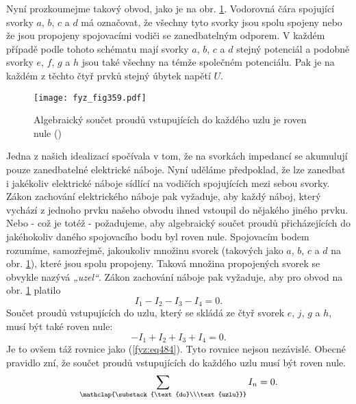   Nyní prozkoumejme takový obvod, jako je na obr. \ref{fyz:fig359}. Vodorovná čára spojující svorky 
  \(a\), \(b\), \(c\) a \(d\) má označovat, že všechny tyto svorky jsou spolu spojeny nebo že jsou 
  propojeny spojovacími vodiči se zanedbatelným odporem. V každém případě podle tohoto schématu 
  mají svorky \(a\), \(b\), \(c\) a \(d\) stejný potenciál a podobně svorky \(e\), \(f\), \(g\) a 
  \(h\) jsou také všechny na témže společném potenciálu. Pak je na každém z těchto čtyř prvků 
  stejný úbytek napětí \(U\).

  \begin{figure}[ht!] %
    \centering
    \texttt{[image: fyz\_fig359.pdf]}
    \caption{Algebraický součet proudů vstupujících do každého uzlu je roven nule
             (\cite[s.~400]{Feynman02})}
    \label{fyz:fig359}
  \end{figure}
  
  Jedna z našich idealizací spočívala v tom, že na svorkách impedancí se akumulují pouze 
  zanedbatelné elektrické náboje. Nyní uděláme předpoklad, že lze zanedbat i jakékoliv elektrické 
  náboje sídlící na vodičích spojujících mezi sebou svorky. Zákon zachování elektrického náboje pak 
  vyžaduje, aby každý náboj, který vychází z jednoho prvku našeho obvodu ihned vstoupil do nějakého 
  jiného prvku. Nebo - což je totéž - požadujeme, aby algebraický součet proudů přicházejících do 
  jakéhokoliv daného spojovacího bodu byl roven nule. Spojovacím bodem rozumíme, samozřejmě, 
  jakoukoliv množinu svorek (takových jako \(a\), \(b\), \(c\) a \(d\) na obr. \ref{fyz:fig359}), 
  které jsou spolu propojeny. Taková množina propojených svorek se obvykle nazývá \emph{„uzel“}. 
  Zákon zachování náboje pak vyžaduje, aby pro obvod na obr. \ref{fyz:fig359} platilo
  \begin{equation}\label{fyz:eq484}
    I_1 - I_2 - I_3 - I_4 = 0.
  \end{equation}
  Součet proudů vstupujících do uzlu, který se skládá ze čtyř svorek \(e\), \(j\), \(g\) a \(h\), 
  musí být také roven nule:
  \begin{equation}\label{fyz:eq485}
    - I_1 + I_2 + I_3 + I_4 = 0.
  \end{equation}
  Je to ovšem táž rovnice jako (\ref{fyz:eq484}). Tyto rovnice nejsou nezávislé. Obecné pravidlo 
  zní, že součet proudů vstupujících do každého uzlu musí být roven nule.
  \begin{equation}\label{fyz:eq486}
    \sum_{\mathclap{\substack{\text{do}\\\text{uzlu}}}} I_n = 0.
  \end{equation}
  
